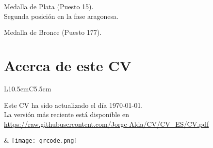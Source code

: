 \documentclass[combined.tex]{subfiles}
\begin{document}
Medalla de Plata (Puesto 15).\\
Segunda posición en la fase aragonesa.

Medalla de Bronce (Puesto 177).

\newpage

\section{Acerca de este CV}
\begin{tabular}{L{10.5cm}C{5.5cm}}
\begin{minipage}[b]{10cm}
Este CV ha sido actualizado el día \today.\\
La versión más reciente está disponible en \\ \url{https://raw.githubusercontent.com/Jorge-Alda/CV/CV_ES/CV.pdf}
\end{minipage} & \texttt{[image: qrcode.png]}
\end{tabular}
\end{document}
